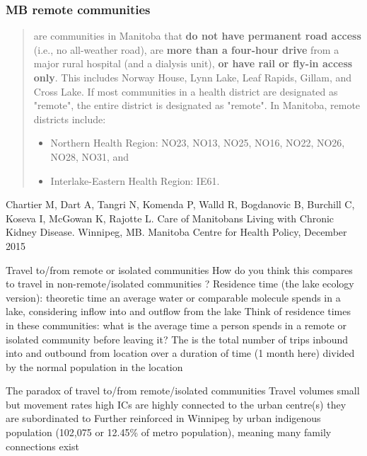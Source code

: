 \documentclass[aspectratio=169]{beamer}
\begin{document}
\begin{frame}\frametitle{MB remote communities}
	\begin{quote}
	 are communities in Manitoba that \textbf{do not have permanent road access} (i.e., no all-weather road), are \textbf{more than a four-hour drive} from a major rural hospital (and a dialysis unit), \textbf{or have rail or fly-in access only}. This includes Norway House, Lynn Lake, Leaf Rapids, Gillam, and Cross Lake. If most communities in a health district are designated as "remote", the entire district is designated as "remote". In Manitoba, remote districts include:
	\begin{itemize}
	\item Northern Health Region: NO23, NO13, NO25, NO16, NO22, NO26, NO28, NO31, and
	\item Interlake-Eastern Health Region: IE61.
	\end{itemize}
	\end{quote}
	\vfill
	\small
	Chartier M, Dart A, Tangri N, Komenda P, Walld R, Bogdanovic B, Burchill C, Koseva I, McGowan K, Rajotte L. Care of Manitobans Living with Chronic Kidney Disease. Winnipeg, MB.
	Manitoba Centre for Health Policy, December 2015
\end{frame}


\begin{frame}{Travel to/from remote or isolated communities}
	How do you think this compares to travel in non-remote/isolated communities ?
	\vfill
	Residence time (the lake ecology version): theoretic time an average water or comparable molecule spends in a lake, considering inflow into and outflow from the lake
	\vfill
	Think of residence times in these communities: what is the average time a person spends in a remote or isolated community before leaving it?
	\vfill
	The  is the total number of trips inbound into and outbound from location over a duration of time (1 month here) divided by the normal population in the location 
\end{frame}


\begin{frame}{The paradox of travel to/from remote/isolated communities}
Travel volumes small but movement rates high
\vfill
ICs are highly connected to the urban centre(s) they are subordinated to
\vfill
Further reinforced in Winnipeg by urban indigenous population (102,075 or 12.45\% of metro population), meaning many family connections exist
\end{frame}
\end{document}

